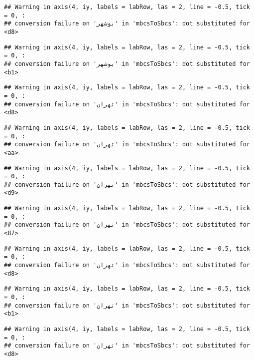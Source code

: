 \documentclass[
]{article}
\begin{document}
\begin{verbatim}
## Warning in axis(4, iy, labels = labRow, las = 2, line = -0.5, tick = 0, :
## conversion failure on 'بوشهر' in 'mbcsToSbcs': dot substituted for <d8>
\end{verbatim}

\begin{verbatim}
## Warning in axis(4, iy, labels = labRow, las = 2, line = -0.5, tick = 0, :
## conversion failure on 'بوشهر' in 'mbcsToSbcs': dot substituted for <b1>
\end{verbatim}

\begin{verbatim}
## Warning in axis(4, iy, labels = labRow, las = 2, line = -0.5, tick = 0, :
## conversion failure on 'تهران' in 'mbcsToSbcs': dot substituted for <d8>
\end{verbatim}

\begin{verbatim}
## Warning in axis(4, iy, labels = labRow, las = 2, line = -0.5, tick = 0, :
## conversion failure on 'تهران' in 'mbcsToSbcs': dot substituted for <aa>
\end{verbatim}

\begin{verbatim}
## Warning in axis(4, iy, labels = labRow, las = 2, line = -0.5, tick = 0, :
## conversion failure on 'تهران' in 'mbcsToSbcs': dot substituted for <d9>
\end{verbatim}

\begin{verbatim}
## Warning in axis(4, iy, labels = labRow, las = 2, line = -0.5, tick = 0, :
## conversion failure on 'تهران' in 'mbcsToSbcs': dot substituted for <87>
\end{verbatim}

\begin{verbatim}
## Warning in axis(4, iy, labels = labRow, las = 2, line = -0.5, tick = 0, :
## conversion failure on 'تهران' in 'mbcsToSbcs': dot substituted for <d8>
\end{verbatim}

\begin{verbatim}
## Warning in axis(4, iy, labels = labRow, las = 2, line = -0.5, tick = 0, :
## conversion failure on 'تهران' in 'mbcsToSbcs': dot substituted for <b1>
\end{verbatim}

\begin{verbatim}
## Warning in axis(4, iy, labels = labRow, las = 2, line = -0.5, tick = 0, :
## conversion failure on 'تهران' in 'mbcsToSbcs': dot substituted for <d8>
\end{verbatim}
\end{document}
